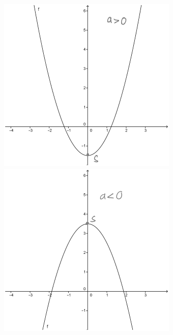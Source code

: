 \begin{enumerate}[A)]
	\begin{figure}[h!]
		\begin{minipage}{0.5\linewidth}
			\includegraphics[width=\linewidth]{Bilder/101}
			\caption{}
		\end{minipage}
		\begin{minipage}{0.5\linewidth}
			\includegraphics[width=\linewidth]{Bilder/102}
			\caption{}
		\end{minipage}
	\end{figure}
	

\end{enumerate}

